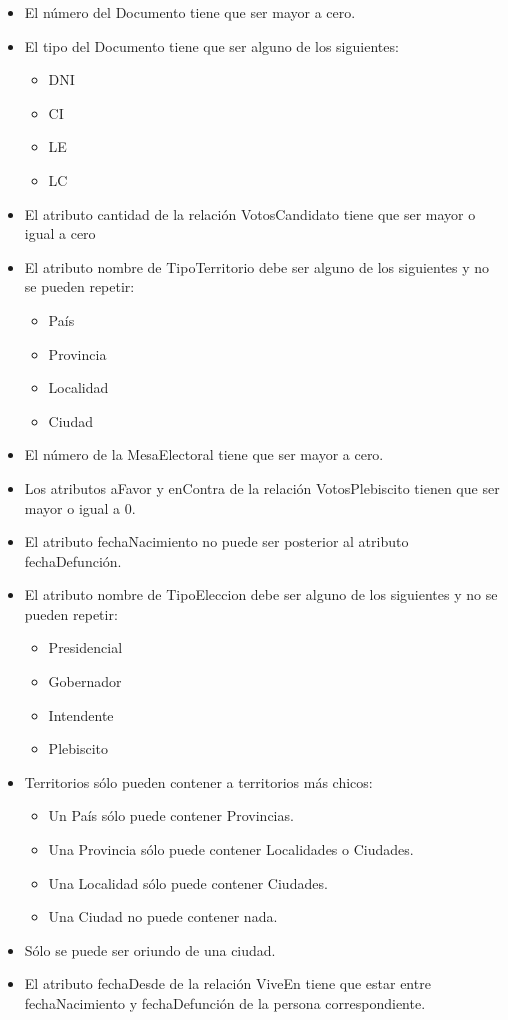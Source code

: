 \begin{itemize}
	\item{El número del Documento tiene que ser mayor a cero}.
	\item{El tipo del Documento tiene que ser alguno de los siguientes:
		\begin{itemize}
			\item{DNI}
			\item{CI}
			\item{LE}
			\item{LC}
		\end{itemize}
	}	
	\item{El atributo cantidad de la relación VotosCandidato tiene que ser mayor o igual a cero}

	\item{El atributo nombre de TipoTerritorio debe ser alguno de los siguientes y no se pueden repetir:
	  \begin{itemize}
	  	\item{País}
	  	\item{Provincia}
	  	\item{Localidad}
	  	\item{Ciudad}
	  \end{itemize}
	 }
	\item{El número de la MesaElectoral tiene que ser mayor a cero.}
	\item{Los  atributos aFavor y enContra de la relación VotosPlebiscito  tienen que ser mayor o igual a 0.}
	\item{El atributo fechaNacimiento no puede ser posterior al atributo fechaDefunción.}
\item{El atributo nombre de TipoEleccion debe ser alguno de los siguientes y no se pueden repetir:
	\begin{itemize}
		\item{Presidencial}
		\item{Gobernador}
		\item{Intendente}
		\item{Plebiscito}
	\end{itemize}
}

\item{Territorios sólo pueden contener a territorios más chicos:
\begin{itemize}
	\item{Un País sólo puede contener Provincias.}
	\item{Una Provincia sólo puede contener Localidades o Ciudades.}
	\item{Una Localidad sólo puede contener Ciudades.}
	\item{Una Ciudad no puede contener nada.}
\end{itemize}
}
\item{Sólo se puede ser oriundo de una ciudad.}
\item{El atributo fechaDesde de la relación ViveEn tiene que estar entre fechaNacimiento y fechaDefunción de la persona correspondiente.}


\end{itemize}
